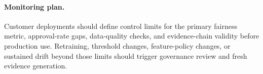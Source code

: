 \paragraph{Monitoring plan.}
Customer deployments should define control limits for the primary fairness metric, approval-rate gaps, data-quality checks, and evidence-chain validity before production use. Retraining, threshold changes, feature-policy changes, or sustained drift beyond those limits should trigger governance review and fresh evidence generation.
